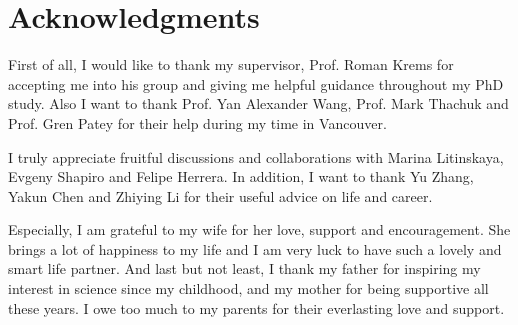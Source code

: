
\chapter{Acknowledgments}


First of all, I would like to thank my supervisor, Prof. Roman Krems for accepting me into his group and giving me helpful guidance throughout my PhD study.
Also I want to thank Prof. Yan Alexander Wang, Prof. Mark Thachuk
and Prof. Gren Patey for their help during my time in Vancouver.
 
I truly appreciate fruitful discussions and collaborations with Marina Litinskaya, Evgeny Shapiro and Felipe Herrera. In addition, I want to thank Yu Zhang, Yakun Chen and Zhiying Li for their useful advice on life and career.
 
 
Especially, I am grateful to my wife for her love, support and encouragement. She brings a lot of happiness to my life and I am very
luck to have such a lovely and smart life partner.
And last but not least, I thank my father for inspiring my
interest in science since my childhood, and my mother for being supportive all these years. I owe too much to my parents
for their everlasting love and support.
